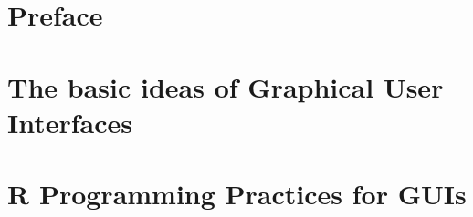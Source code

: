 \documentclass[showtrims]{memoir}
\begin{document}
\thispagestyle{empty}


\frontmatter

\chapter*{Preface}
\label{chap:preface}

\newpage



\setcounter{tocdepth}{3}
\tableofcontents
\newpage



\graphicspath{
  {ch-Preface/}
  {ch-GUIBasics/}
  {ch-ProgrammingPractices/}
  {ch-gWidgets/}
  {ch-RGtk2/}
  {ch-RwxWidgets/}
  {ch-tcltk/}
  {ch-WebGUIs/}
}


\mainmatter
\chapter{The basic ideas of Graphical User Interfaces}
\label{chap:GUIBasics}




\chapter{R Programming Practices for GUIs}
\label{chap:programming-practices}
%



\label{chap:gWidgets-intro}



\label{chap:RGtk2}



% 
\end{document}
